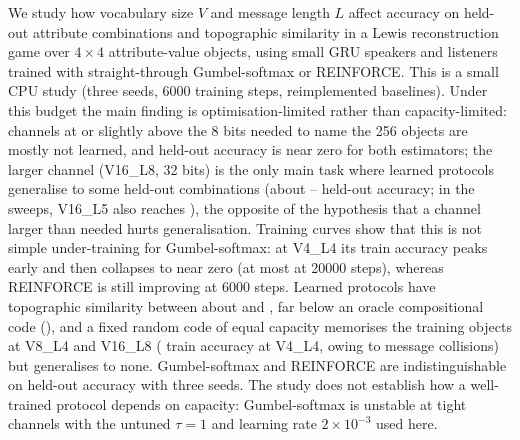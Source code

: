 We study how vocabulary size $V$ and message length $L$ affect accuracy on held-out attribute combinations and topographic similarity in a Lewis reconstruction game over $4\times4$ attribute-value objects, using small GRU speakers and listeners trained with straight-through Gumbel-softmax or REINFORCE. This is a small CPU study (three seeds, 6000 training steps, reimplemented baselines). Under this budget the main finding is optimisation-limited rather than capacity-limited: channels at or slightly above the 8 bits needed to name the 256 objects are mostly not learned, and held-out accuracy is near zero for both estimators; the larger channel (V16\_L8, 32 bits) is the only main task where learned protocols generalise to some held-out combinations (about -- held-out accuracy; in the sweeps, V16\_L5 also reaches ), the opposite of the hypothesis that a channel larger than needed hurts generalisation. Training curves show that this is not simple under-training for Gumbel-softmax: at V4\_L4 its train accuracy peaks early and then collapses to near zero (at most  at 20000 steps), whereas REINFORCE is still improving at 6000 steps. Learned protocols have topographic similarity between about  and , far below an oracle compositional code (), and a fixed random code of equal capacity memorises the training objects at V8\_L4 and V16\_L8 ( train accuracy at V4\_L4, owing to message collisions) but generalises to none. Gumbel-softmax and REINFORCE are indistinguishable on held-out accuracy with three seeds. The study does not establish how a well-trained protocol depends on capacity: Gumbel-softmax is unstable at tight channels with the untuned $\tau=1$ and learning rate $2\times10^{-3}$ used here.
